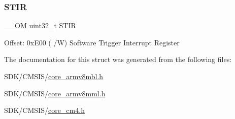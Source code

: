 \mbox{\label{struct_n_v_i_c___type_ada9cbba14ab1cc3fddd585f870932db8}} 
\subsubsection{\texorpdfstring{S\+T\+IR}{STIR}}
{\footnotesize\ttfamily \mbox{\hyperlink{core__cm4_8h_a0ea2009ed8fd9ef35b48708280fdb758}{\+\_\+\+\_\+\+OM}} uint32\+\_\+t S\+T\+IR}

Offset\+: 0x\+E00 ( /W) Software Trigger Interrupt Register 

The documentation for this struct was generated from the following files\+:\begin{DoxyCompactItemize}
\item 
S\+D\+K/\+C\+M\+S\+I\+S/\mbox{\hyperlink{core__armv8mbl_8h}{core\+\_\+armv8mbl.\+h}}\item 
S\+D\+K/\+C\+M\+S\+I\+S/\mbox{\hyperlink{core__armv8mml_8h}{core\+\_\+armv8mml.\+h}}\item 
S\+D\+K/\+C\+M\+S\+I\+S/\mbox{\hyperlink{core__cm4_8h}{core\+\_\+cm4.\+h}}\end{DoxyCompactItemize}
